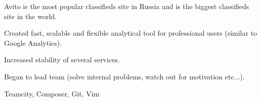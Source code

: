   Avito is the most popular classifieds site in Russia and is the biggest
  classifieds site in the world.
  \begin{gaas}
    \item Created fast, scalable and flexible analytical tool for professional
      users (similar to Google Analytics).
    \item Increased stability of several services.
    \item Began to lead team (solve internal problems, watch out for
      motivation etc...).
  \end{gaas}
  \devtools
    Teamcity, Composer, Git, Vim

